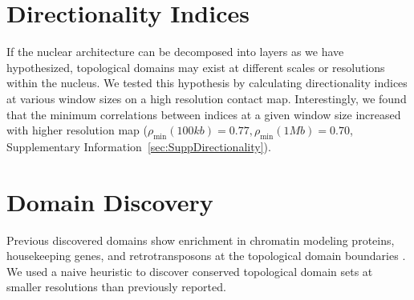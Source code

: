 \section*{Directionality Indices}

If the nuclear architecture can be decomposed into layers as we have hypothesized, topological domains may exist at different
scales or resolutions within the nucleus.  We tested this hypothesis by calculating directionality indices at various window sizes
on a high resolution contact map.  Interestingly, we found that the minimum correlations between indices at a given window size increased
with higher resolution map ($\rho_{\min}(100kb) = 0.77, \rho_{\min}(1Mb) = 0.70$, Supplementary Information~\ref{sec:SuppDirectionality}).

\section*{Domain Discovery}

Previous discovered domains show enrichment in chromatin modeling proteins, housekeeping genes, and retrotransposons at the topological domain
boundaries \citep{dixon2012}.  We used a naive heuristic to discover conserved topological domain sets at smaller resolutions than previously reported.

